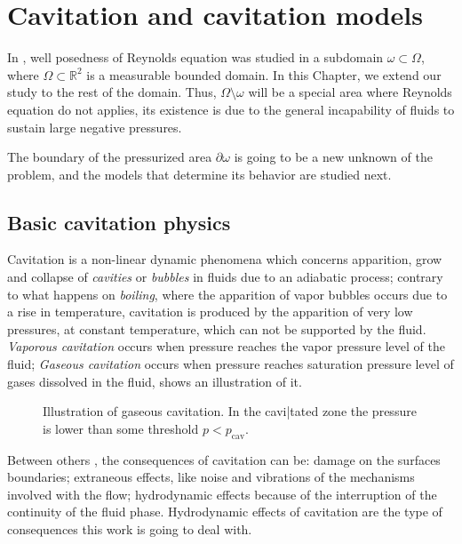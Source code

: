 
\chapter{Cavitation and cavitation models}
\label{chap:chapter4} %

In , well posedness of Reynolds equation was studied in a subdomain $\omega\subset \Omega$, where $\Omega\subset \mathbb{R}^2$ is a measurable bounded domain. In this Chapter, we extend our study to the rest of the domain. Thus, $\Omega\setminus \omega$ will be a special area where Reynolds equation do not applies, its existence is due to the general incapability of fluids to sustain large negative pressures. 

The boundary of the pressurized area $\partial \omega$ is going to be a new unknown of the problem, and the models that determine its behavior are studied next.
\section{Basic cavitation physics}
Cavitation is a non-linear dynamic phenomena which concerns apparition, grow and collapse of \emph{cavities} or \emph{bubbles} in fluids due to an adiabatic process; contrary to what happens on \emph{boiling}, where the apparition of vapor bubbles occurs due to a rise in temperature, cavitation is produced by the apparition of very low pressures, at constant temperature, which can not be supported by the fluid. \emph{Vaporous cavitation} occurs when pressure reaches the vapor pressure level of the fluid; \emph{Gaseous cavitation} occurs when pressure reaches saturation pressure level of gases dissolved in the fluid,  shows an illustration of it.
\begin{figure}[h!]
\centering 
\def\svgwidth{\textwidth}	
\caption[Illustration of gaseous cavitation]{Illustration of gaseous cavitation. In the cavi|tated zone the pressure is lower than 
 some threshold  $p<p_\text{cav}$.}\label{fig:gaseous_cavitation}
\end{figure}

Between others \cite{knapp1970}, the consequences of cavitation can be: damage on the surfaces boundaries; extraneous effects, like noise and vibrations of the mechanisms involved with the flow; hydrodynamic effects because of the interruption of the continuity of the fluid phase. Hydrodynamic effects of cavitation are the type of consequences this work is going to deal with.

